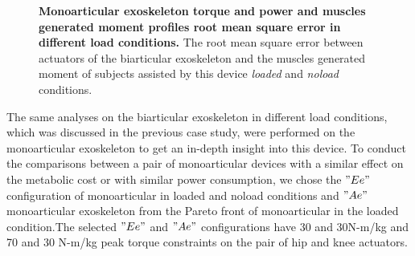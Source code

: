 \documentclass[10pt,letterpaper]{article}
\begin{document}
\begin{figure}[ht!]
	\centering
	\hfil
	\vspace{1mm}
	\caption{\small{\textbf{Monoarticular exoskeleton torque and power and muscles generated moment profiles root mean square error in different load conditions.} The root mean square error between actuators of the biarticular exoskeleton and the muscles generated moment of subjects assisted by this device {\it loaded} and {\it noload} conditions.}}
	\label{Fig_Case04_RMSE}
\end{figure}
The same analyses on the biarticular exoskeleton in different load conditions, which was discussed in the previous case study,  were performed on the monoarticular exoskeleton to get an in-depth insight into this device. To conduct the comparisons between a pair of monoarticular devices with a similar effect on the metabolic cost or with similar power consumption, we chose the $"Ee"$ configuration of monoarticular in loaded and noload conditions and $"Ae"$ monoarticular exoskeleton from the Pareto front of monoarticular in the loaded condition.The selected $"Ee"$ and $"Ae"$ configurations have 30 and 30N-m/kg and 70 and 30 N-m/kg peak torque constraints on the pair of hip and knee actuators.\\
\end{document}
